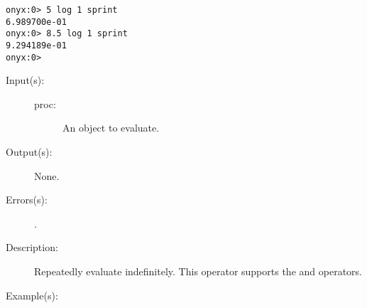 \begin{description}
\begin{description}
\begin{verbatim}
onyx:0> 5 log 1 sprint
6.989700e-01
onyx:0> 8.5 log 1 sprint
9.294189e-01
onyx:0>
		\end{verbatim}
	\end{description}
\label{systemdict:loop}
\item[{\onyxop{proc}{loop}{--}}: ]
	\begin{description}\item[]
	\item[Input(s): ]
		\begin{description}\item[]
		\item[proc: ]
			An object to evaluate.
		\end{description}
	\item[Output(s): ] None.
	\item[Errors(s): ]
		\begin{description}\item[]
		\item[.]
		\end{description}
	\item[Description: ]
		Repeatedly evaluate  indefinitely.  This operator
		supports the
		 and
		 operators.
	\item[Example(s): ]\begin{verbatim}


\end{verbatim}
\end{description}
\end{description}

